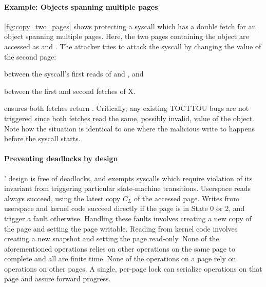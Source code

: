 \documentclass[letterpaper,twocolumn,10pt]{article}
\begin{document}
\paragraph{Example: Objects spanning multiple pages}
\autoref{fig:copy_two_pages} shows \midas protecting a syscall which
has a double fetch for an object spanning multiple pages.
Here, the two pages containing the object  are accessed as
 and .
The attacker tries to attack the syscall by changing the value of the
second page:
\begin{inparaenum}
\item between the syscall's first reads of  and , and
\item between the first and second fetches of X.
\end{inparaenum}
\midas ensures both fetches return .
Critically, any existing TOCTTOU bugs are not triggered since both fetches
read the same, possibly invalid, value of the object.
Note how the situation is identical to one where the malicious write
to  happens before the syscall starts.

\paragraph{Preventing deadlocks by design}
\midas' design is free of deadlocks, and exempts syscalls which
require violation of its invariant from triggering particular
state-machine transitions.
Userspace reads always succeed, using the latest copy $C_L$ of the
accessed page.
Writes from userspace and kernel code succeed directly if the
page is in State 0 or 2, and trigger a fault otherwise.
Handling these faults involves creating a new copy of the page and
setting the page writable.
Reading from kernel code involves creating a new snapshot and
setting the page read-only.
None of the aforementioned operations relies on other operations
on the same page to complete and all are finite time.
None of the operations on a page rely on operations on other pages.
A single, per-page lock can serialize operations on that page
and assure forward progress.
\end{document}
